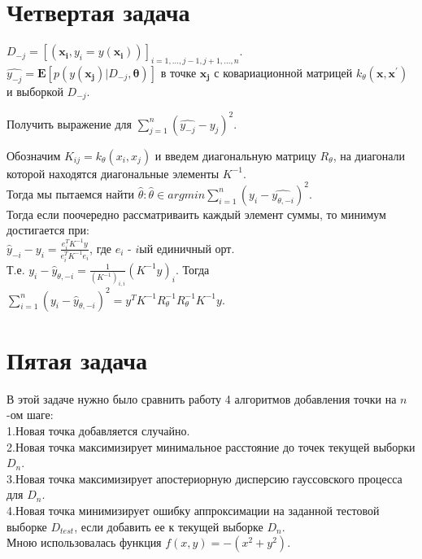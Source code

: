 \documentclass{article}
\begin{document}
\section{Четвертая задача}
$D_{-j} = [(\mathbf{x_i}, y_i = y(\mathbf{x_i}))]_{i = 1,...,j-1,j+1,...,n}$.\\
$\hat{y_{-j}} = \mathbf{E}[p(y(\mathbf{x_j})|D_{-j}, \mathbf{\theta})]$ в точке $\mathbf{x_j}$ с ковариационной матрицей $k_{\theta}(\mathbf{x}, \mathbf{x^{'}})$ и выборкой $D_{-j}$.
\begin{center}
Получить выражение для $\sum\limits_{j=1}^{n} (\hat{y_{-j}} - y_j)^2$.
\end{center}
Обозначим $K_{ij} = k_{\theta}(x_i, x_j)$ и введем диагональную матрицу $R_{\theta}$, на диагонали которой находятся диагональные элементы $K^{-1}$.\\
Тогда мы пытаемся найти $\hat{\theta} : \hat{\theta} \in argmin \sum\limits_{i=1}^{n} (y_i - \hat{y_{\theta, -i}})^2$.\\
Тогда если поочередно рассматриваить каждый элемент суммы, то минимум достигается при:\\
$\hat{y}_{-i} - y_{i} = \frac{e_i^{T}K^{-1}y}{e_i^{T}K^{-1}e_i}$, где $e_i$ - $i$ый единичный орт.\\
Т.е. $y_i - \hat{y}_{\theta,-i} = \frac{1}{(K^{-1})_{i,i}}(K^{-1}y)_{i}$. Тогда $\sum\limits_{i=1}^{n} (y_i - \hat{y}_{\theta,-i})^2 = y^{T}K^{-1}R_{\theta}^{-1}R_{\theta}^{-1}K^{-1}y$.



\section{Пятая задача}
В этой задаче нужно было сравнить работу 4 алгоритмов добавления точки на $n$-ом шаге:\\
1.Новая точка добавляется случайно.\\
2.Новая точка максимизирует минимальное расстояние до точек текущей выборки $D_n$.\\
3.Новая точка максимизирует апостериорную дисперсию гауссовского процесса для $D_n$.\\
4.Новая точка минимизирует ошибку аппроксимации на заданной тестовой выборке $D_{test}$, если добавить ее к текущей выборке $D_n$.\\
Мною использовалась функция $f(x, y) = -(x^2 + y^2)$.\\
\end{document}
